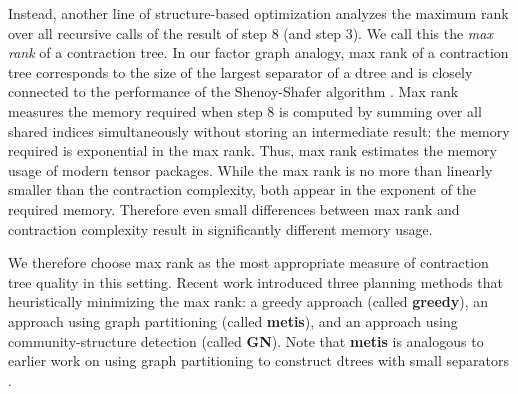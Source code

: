 Instead, another line of structure-based optimization analyzes the maximum rank over all recursive calls of the result of step 8 (and step 3). We call this the \emph{max rank} of a contraction tree. In our factor graph analogy, max rank of a contraction tree corresponds to the size of the largest separator of a dtree \cite{darwiche01b} and is closely connected to the performance of the Shenoy-Shafer algorithm \cite{shenoy97,SS08}. Max rank measures the memory required when step 8 is computed by summing over all shared indices simultaneously without storing an intermediate result: the memory required is exponential in the max rank. Thus, max rank estimates the memory usage of modern tensor packages. While the max rank is no more than linearly smaller than the contraction complexity, both appear in the exponent of the required memory. Therefore even small differences between max rank and contraction complexity result in significantly different memory usage. 

We therefore choose max rank as the most appropriate measure of contraction tree quality in this setting. 
Recent work \cite{KCMR18} introduced three planning methods that heuristically minimizing the max rank: a greedy approach (called \textbf{greedy}), an approach using graph partitioning (called \textbf{metis}), and an approach using community-structure detection (called \textbf{GN}). Note that \textbf{metis} is analogous to earlier work on using graph partitioning to construct dtrees with small separators \cite{darwiche01b}.